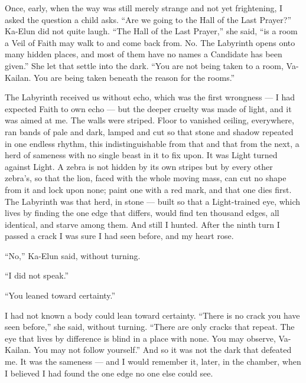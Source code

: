 Once, early, when the way was still merely strange and not yet frightening, I asked the question a child asks. ``Are we going to the Hall of the Last Prayer?'' Ka-Elun did not quite laugh. ``The Hall of the Last Prayer,'' she said, ``is a room a Veil of Faith may walk to and come back from. No. The Labyrinth opens onto many hidden places, and most of them have no names a Candidate has been given.'' She let that settle into the dark. ``You are not being taken to a room, Va-Kailan. You are being taken beneath the reason for the rooms.''\par
 
The Labyrinth received us without echo, which was the first wrongness — I had expected Faith to own echo — but the deeper cruelty was made of light, and it was aimed at me. The walls were striped. Floor to vanished ceiling, everywhere, ran bands of pale and dark, lamped and cut so that stone and shadow repeated in one endless rhythm, this indistinguishable from that and that from the next, a herd of sameness with no single beast in it to fix upon. It was Light turned against Light. A zebra is not hidden by its own stripes but by every other zebra's, so that the lion, faced with the whole moving mass, can cut no shape from it and lock upon none; paint one with a red mark, and that one dies first. The Labyrinth was that herd, in stone — built so that a Light-trained eye, which lives by finding the one edge that differs, would find ten thousand edges, all identical, and starve among them. And still I hunted. After the ninth turn I passed a crack I was sure I had seen before, and my heart rose.\par
 
``No,'' Ka-Elun said, without turning.\par
 
``I did not speak.''\par
 
``You leaned toward certainty.''\par
 
I had not known a body could lean toward certainty. ``There is no crack you have seen before,'' she said, without turning. ``There are only cracks that repeat. The eye that lives by difference is blind in a place with none. You may observe, Va-Kailan. You may not follow yourself.'' And so it was not the dark that defeated me. It was the sameness — and I would remember it, later, in the chamber, when I believed I had found the one edge no one else could see.\par
 
